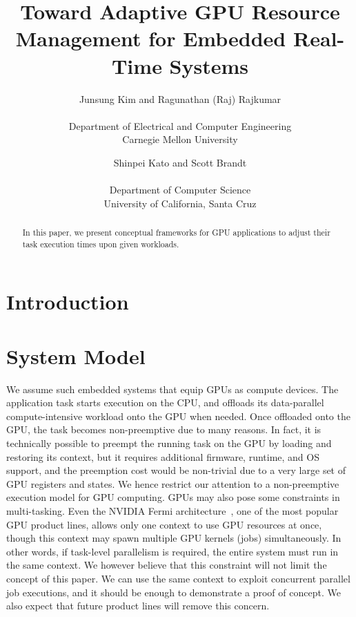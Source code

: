 \documentclass[times, 10pt, twocolumn]{article}
\begin{document}
\title{
Toward Adaptive GPU Resource Management for Embedded Real-Time Systems
}

\author {
Junsung Kim and Ragunathan (Raj) Rajkumar\\
\\
Department of Electrical and Computer Engineering\\
Carnegie Mellon University
\and
Shinpei Kato and Scott Brandt\\
\\
Department of Computer Science\\
University of California, Santa Cruz
}

\maketitle

\thispagestyle{empty}

\begin{abstract}
 In this paper, we present conceptual frameworks for GPU applications to
 adjust their task execution times upon given workloads.
\end{abstract}

\section{Introduction}
\label{sec:introduction}

\section{System Model}
\label{sec:system_model}

We assume such embedded systems that equip GPUs as compute devices.
The application task starts execution on the CPU, and offloads its
data-parallel compute-intensive workload onto the GPU when needed.
Once offloaded onto the GPU, the task becomes non-preemptive due to many
reasons.
In fact, it is technically possible to preempt the running task on the
GPU by loading and restoring its context, but it requires additional
firmware, runtime, and OS support, and the preemption cost would be
non-trivial due to a very large set of GPU registers and states.
We hence restrict our attention to a non-preemptive execution model for
GPU computing.
GPUs may also pose some constraints in multi-tasking.
Even the NVIDIA Fermi architecture~\cite{Fermi}, one of the most popular
GPU product lines, allows only one context to use GPU resources at
once, though this context may spawn multiple GPU kernels (jobs)
simultaneously.
In other words, if task-level parallelism is required, the entire system
must run in the same context.
We however believe that this constraint will not limit the concept of
this paper.
We can use the same context to exploit concurrent parallel job
executions, and it should be enough to demonstrate a proof of concept. 
We also expect that future product lines will remove this concern.
\end{document}
